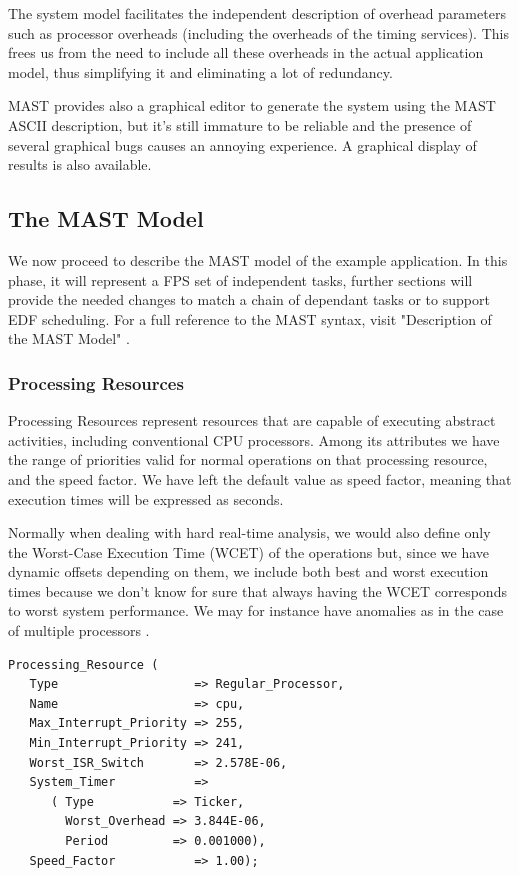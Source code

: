 \documentclass{article}
\begin{document}
The system model facilitates the independent description of overhead parameters such as processor overheads (including the overheads of the timing services). This frees us from the need to include all these overheads in the actual application model, thus simplifying it and eliminating a lot of redundancy.

MAST provides also a graphical editor to generate the system using the MAST ASCII description, but it's still immature to be reliable and the presence of several graphical bugs causes an annoying experience. A graphical display of results is also available.

\subsection{The MAST Model}

We now proceed to describe the MAST model of the example application. In this phase, it will represent a FPS set of independent tasks, further sections will provide the needed changes to match a chain of dependant tasks or to support EDF scheduling. For a full reference to the MAST syntax, visit "Description of the MAST Model" \cite{mast-description}.

\subsubsection{Processing Resources}\label{processing-resources}

Processing Resources represent resources that are capable of executing abstract activities, including conventional CPU processors. Among its attributes we have the range of priorities valid for normal operations on that processing resource, and the speed factor. We have left the default value as speed factor, meaning that execution times will be expressed as seconds.

Normally when dealing with hard real-time analysis, we would also define only the Worst-Case Execution Time (WCET) of the operations but, since we have dynamic offsets depending on them, we include both best and worst execution times because we don't know for sure that always having the WCET corresponds to worst system performance. We may for instance have anomalies as in the case of multiple processors \cite{anomalies-multiprocessor}.

\begin{lstlisting}
Processing_Resource (
   Type                   => Regular_Processor,
   Name                   => cpu,
   Max_Interrupt_Priority => 255,
   Min_Interrupt_Priority => 241,
   Worst_ISR_Switch       => 2.578E-06,
   System_Timer           =>
      ( Type           => Ticker,
        Worst_Overhead => 3.844E-06,
        Period         => 0.001000),
   Speed_Factor           => 1.00);
\end{lstlisting}
\end{document}

